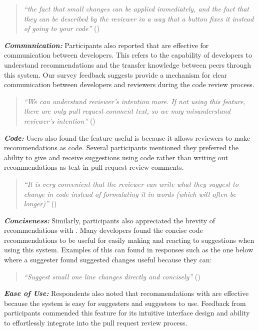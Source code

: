 \begin{quote}
    \textit{``the fact that small changes can be applied immediately, and the fact that they can be described by the reviewer in a way that a button fixes it instead of going to your code''} ()
\end{quote}

\textbf{\textit{Communication:}} Participants also reported that \suggs are effective for communication between developers. This refers to the capability of developers to understand recommendations and the transfer knowledge between peers through this system. Our survey feedback suggests \sugg provide a mechanism for clear communication between developers and reviewers during the code review process.

\begin{quote}
    \textit{``We can understand reviewer's intention more. If not using this feature, there are only pull request comment text, so we may misunderstand reviewer's intention''} ()
\end{quote}

\textbf{\textit{Code:}} Users also found the \suggs feature useful is because it allows reviewers to make recommendations as code. Several participants mentioned they preferred the ability to give and receive suggestions using code rather than writing out recommendations as text in pull request review comments.

\begin{quote}
     \textit{``It is very convenient that the reviewer can write what they suggest to change in code instead of formulating it in words (which will often be longer)''} ()
\end{quote}

\textbf{\textit{Conciseness:}} Similarly, participants also appreciated the brevity of recommendations with \sugg. Many developers found the concise code recommendations to be useful for easily making and reacting to suggestions when using this system. Examples of this can found in responses such as the one below where a suggester found suggested changes useful because they can:

\begin{quote}
    \textit{``Suggest small one line changes directly and concisely''} ()
\end{quote}

\textbf{\textit{Ease of Use:}} Respondents also noted that recommendations with \sugg are effective because the system is easy for suggesters and suggestees to use. Feedback from participants commended this feature for its intuitive interface design and ability to effortlessly integrate into the pull request review process.

